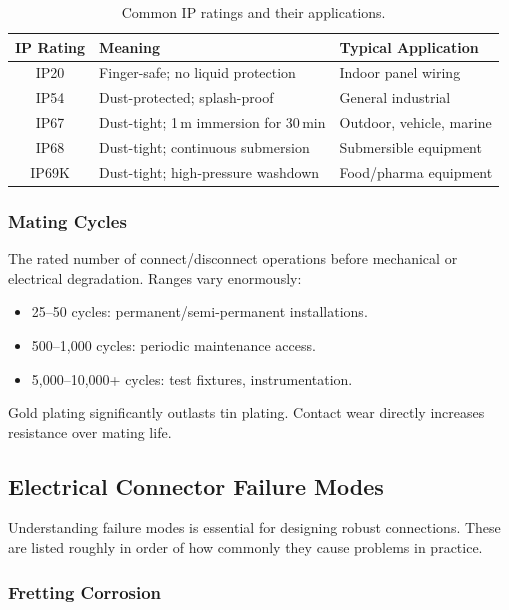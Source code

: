 \documentclass[11pt,letterpaper,twoside,openany]{book}
\begin{document}
\begin{table}[ht!]
\centering
\small
\begin{tabular}{c l l}
  \toprule
  \textbf{IP Rating} & \textbf{Meaning} & \textbf{Typical Application} \\
  \midrule
  IP20 & Finger-safe; no liquid protection & Indoor panel wiring \\
  IP54 & Dust-protected; splash-proof & General industrial \\
  IP67 & Dust-tight; 1\,m immersion for 30\,min & Outdoor, vehicle, marine \\
  IP68 & Dust-tight; continuous submersion & Submersible equipment \\
  IP69K & Dust-tight; high-pressure washdown & Food/pharma equipment \\
  \bottomrule
\end{tabular}
\caption{Common IP ratings and their applications.}
\end{table}

\subsubsection{Mating Cycles}

The rated number of connect/disconnect operations before mechanical or electrical degradation. Ranges vary enormously:
\begin{itemize}[nosep,leftmargin=1.5em]
  \item 25--50 cycles: permanent/semi-permanent installations.
  \item 500--1,000 cycles: periodic maintenance access.
  \item 5,000--10,000+ cycles: test fixtures, instrumentation.
\end{itemize}
Gold plating significantly outlasts tin plating. Contact wear directly increases resistance over mating life.


\subsection{Electrical Connector Failure Modes}
\label{sec:elecfailure}

Understanding failure modes is essential for designing robust connections. These are listed roughly in order of how commonly they cause problems in practice.

\subsubsection{Fretting Corrosion}
\end{document}
